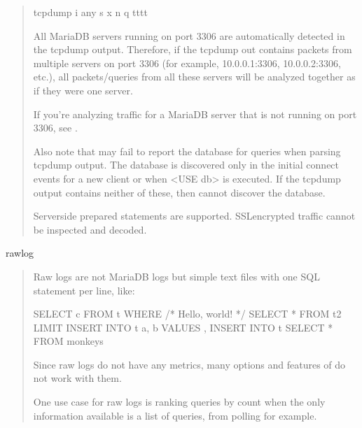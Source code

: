 \documentclass[letterpaper,10pt,english]{sphinxmanual}
\begin{document}
\begin{fulllineitems}
\begin{quote}
\begin{sphinxVerbatim}[commandchars=\\\{\}]
tcpdump \PYGZhy{}i any \PYGZhy{}s  \PYGZhy{}x \PYGZhy{}n \PYGZhy{}q \PYGZhy{}tttt 
\end{sphinxVerbatim}

All MariaDB servers running on port 3306 are automatically detected in the
tcpdump output.  Therefore, if the tcpdump out contains packets from
multiple servers on port 3306 (for example, 10.0.0.1:3306, 10.0.0.2:3306,
etc.), all packets/queries from all these servers will be analyzed
together as if they were one server.

If you’re analyzing traffic for a MariaDB server that is not running on port
3306, see {\hyperref[\detokenize{mariadb-query-digest:cmdoption-mariadb-query-digest-watch-server}]{}}.

Also note that  may fail to report the database for queries
when parsing tcpdump output.  The database is discovered only in the initial
connect events for a new client or when \textless{}USE db\textgreater{} is executed.  If the tcpdump
output contains neither of these, then  cannot discover the
database.

Server\sphinxhyphen{}side prepared statements are supported.  SSL\sphinxhyphen{}encrypted traffic cannot be
inspected and decoded.
\end{quote}

rawlog
\begin{quote}

Raw logs are not MariaDB logs but simple text files with one SQL statement
per line, like:

\begin{sphinxVerbatim}[commandchars=\\\{\}]
SELECT c FROM t WHERE 
/* Hello, world! */ SELECT * FROM t2 LIMIT 
INSERT INTO t a, b VALUES , 
INSERT INTO t SELECT * FROM monkeys
\end{sphinxVerbatim}

Since raw logs do not have any metrics, many options and features of
 do not work with them.

One use case for raw logs is ranking queries by count when the only
information available is a list of queries, from polling 
for example.
\end{quote}

\end{fulllineitems}
\end{document}
